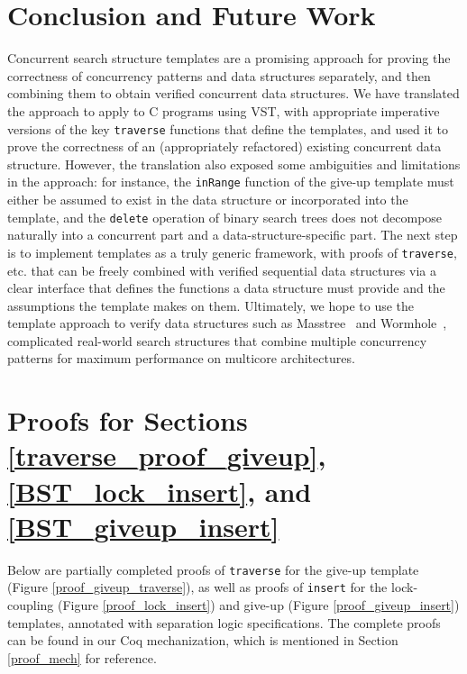 \documentclass[a4paper,UKenglish,cleveref, autoref, thm-restate]{lipics-v2021}
\newcommand{\wm}[1]{\textbf{\textcolor{violet}{[William: #1]}}}
\begin{document}
\section{Conclusion and Future Work}
Concurrent search structure templates are a promising approach for proving the correctness of concurrency patterns and data structures separately, and then combining them to obtain verified concurrent data structures. We have translated the approach to apply to C programs using VST, with appropriate imperative versions of the key \lstinline{traverse} functions that define the templates, and used it to prove the correctness of an (appropriately refactored) existing concurrent data structure. However, the translation also exposed some ambiguities and limitations in the approach: for instance, the \lstinline{inRange} function of the give-up template must either be assumed to exist in the data structure or incorporated into the template, and the \lstinline{delete} operation of binary search trees does not decompose naturally into a concurrent part and a data-structure-specific part.  %
The next step is to implement templates as a truly generic framework, with proofs of \lstinline{traverse}, etc. that can be freely combined with verified sequential data structures via a clear interface that defines the functions a data structure must provide and the assumptions the template makes on them.
Ultimately, we hope to use the template approach to verify data structures such as Masstree~\cite{masstree} and Wormhole~\cite{wormhole}, complicated real-world search structures that combine multiple concurrency patterns for maximum performance on multicore architectures.




\appendix

\section{Proofs for Sections \ref{traverse_proof_giveup}, \ref{BST_lock_insert}, and \ref{BST_giveup_insert}}
\label{sec:apd_proof}
Below are partially completed proofs of \texttt{traverse} for the give-up template (Figure \ref{proof_giveup_traverse}), as well as proofs of \texttt{insert} for the lock-coupling (Figure \ref{proof_lock_insert}) and give-up (Figure \ref{proof_giveup_insert}) templates, annotated with separation logic specifications. The complete proofs can be found in our Coq mechanization, which is mentioned in Section \ref{proof_mech} for reference.
\end{document}
